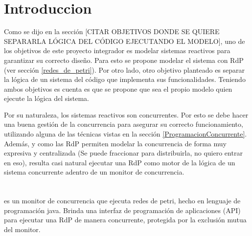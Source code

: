 \section{Introduccion}
\label{sec:petri_concurrency_monitor_intro}
Como se dijo en la sección [{\color{red}CITAR OBJETIVOS DONDE SE QUIERE
SEPARARLA LÓGICA DEL CÓDIGO EJECUTANDO EL MODELO}], uno de los objetivos de este proyecto integrador es
{\color{green} modelar sistemas reactivos para garantizar su correcto
diseño}.
Para esto se propone modelar el sistema con RdP (ver sección \ref{redes_de_petri}).
Por otro lado, otro objetivo planteado es {\color{green} separar la lógica de un
sistema del código que implementa sus funcionalidades}.
Teniendo ambos objetivos es cuenta es que se propone que sea el propio modelo
quien ejecute la lógica del sistema.

Por su naturaleza, los sistemas reactivos son concurrentes. Por esto se debe
hacer una buena gestión de la concurrencia para asegurar su correcto
funcionamiento, utilizando alguna de las técnicas vistas en
la sección \ref{ProgramacionConcurrente}. Además, y como las RdP permiten
modelar la concurrencia de forma muy expresiva y centralizada {\color{blue}(Se puede
fraccionar para distribuirla, no quiero entrar en eso)}, resulta casi natural
ejecutar una RdP como {\color{red} motor} de la lógica de un sistema concurrente
adentro de un monitor de concurrencia.

\section{\javapetriconcurrencymonitor}
\label{sec:java_petri_concurrency_monitor}
\javapetriconcurrencymonitor es un monitor de concurrencia que ejecuta redes
de petri, hecho en lenguaje de programación java.
Brinda una interfaz de programación de aplicaciones (API) para ejecutar una RdP
de manera concurrente, protegida por la exclusión mutua del monitor.

